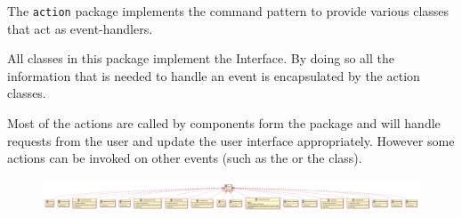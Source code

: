 The \texttt{action} package implements the command pattern to provide various classes that act as event-handlers.

All classes in this package implement the \texttt{} Interface.
By doing so all the information that is needed to handle an event is encapsulated by the
action classes.

Most of the actions are called by components form the \texttt{}
package and will handle requests from the user and update the user interface appropriately.
However some actions can be invoked on other events (such as the \texttt{}
or the \texttt{} class).

\begin{figure}[H]
	\centering
	\includegraphics[width=\textwidth]{packageDiagrams/actionPackage}
\end{figure}
